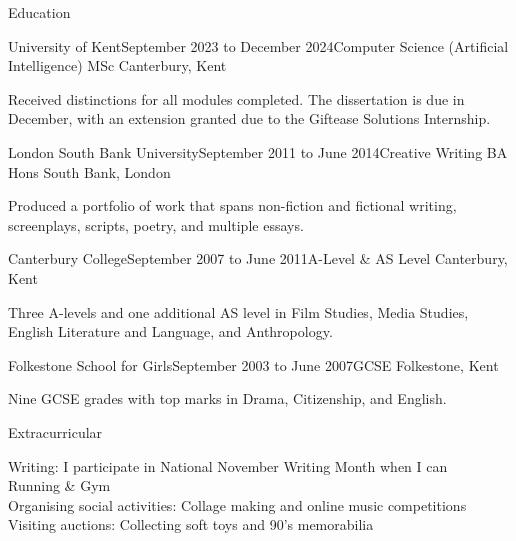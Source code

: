 \documentclass[
	11pt, %
]{resume} %
\begin{document}

\begin{rSection}{Education}

    \begin{rSubsection}{University of Kent}{September 2023 to December 2024}{Computer Science (Artificial Intelligence) MSc} {Canterbury, Kent}
        \item Received distinctions for all modules completed. The dissertation is due in December, with an extension granted due to the Giftease Solutions Internship.
    \end{rSubsection}

    \begin{rSubsection}{London South Bank University}{September 2011 to June 2014}{Creative Writing BA Hons} {South Bank, London}
        \item Produced a portfolio of work that spans non-fiction and fictional writing, screenplays, scripts, poetry, and multiple essays.
    \end{rSubsection}

    \begin{rSubsection}{Canterbury College}{September 2007 to June 2011}{A-Level \& AS Level} {Canterbury, Kent}
        \item Three A-levels and one additional AS level in Film Studies, Media Studies, English Literature and Language, and Anthropology.
    \end{rSubsection}

    \begin{rSubsection}{Folkestone School for Girls}{September 2003 to June 2007}{GCSE} {Folkestone, Kent}
        \item Nine GCSE grades with top marks in Drama, Citizenship, and English.
    \end{rSubsection}

\end{rSection}




\begin{rSection}{Extracurricular}

Writing: I participate in National November Writing Month when I can\\
Running \& Gym\\
Organising social activities: Collage making and online music competitions\\
Visiting auctions: Collecting soft toys and 90's memorabilia\\

\end{rSection}
\end{document}
